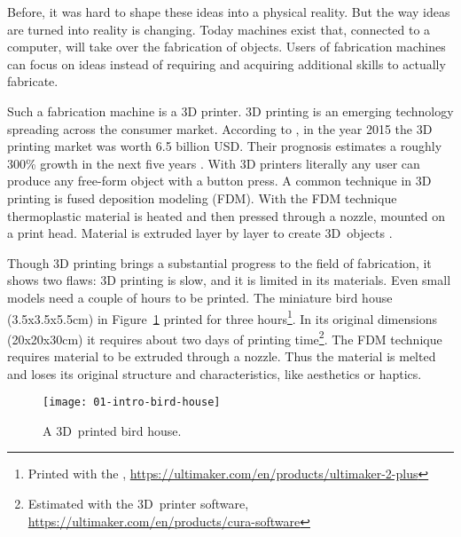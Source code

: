 \documentclass[../ClassicThesis.tex]{subfiles}
\begin{document}
Before, it was hard to shape these ideas into a physical reality. But
the way ideas are turned into reality is changing. Today machines
exist that, connected to a computer, will take over the fabrication of
objects. Users of fabrication machines can focus on ideas
instead of requiring and acquiring additional skills to actually
fabricate.


Such a fabrication machine is a 3D printer. 3D printing is an emerging
technology spreading across the consumer market. According to
, in the year 2015 the 3D printing market was
worth 6.5 billion USD. Their prognosis estimates a roughly 300\%
growth in the next five years \cite{wohlers-market}. With 3D printers
literally any user can produce any free-form object with a button
press. A common technique in 3D printing is fused deposition modeling
(FDM). With the FDM technique
thermoplastic material is heated and then pressed through a nozzle,
mounted on a print head. Material is extruded layer by layer  to
create 3D~objects \cite{fdm}.

Though 3D printing brings a substantial progress to the
field of fabrication, it shows two flaws: 3D printing is
slow, and it is limited in its materials. Even small models
need a couple of hours to be printed. The miniature bird
house (3.5x3.5x5.5cm) in Figure~\ref{fig:intro-bird-house}
printed for three hours\footnote{Printed with the
  ,
  \url{https://ultimaker.com/en/products/ultimaker-2-plus}}.
In its original dimensions (20x20x30cm) it requires about
two days of printing time\footnote{Estimated with the
   3D~printer software,
  \url{https://ultimaker.com/en/products/cura-software}}.
The FDM technique requires material to be extruded through a
nozzle. Thus the material is melted and loses its original
structure and characteristics, like aesthetics or haptics.

\begin{figure}[ht]
  \texttt{[image: 01-intro-bird-house]}
  \caption{A 3D~printed bird house.}
  \label{fig:intro-bird-house}
\end{figure}


\end{document}
